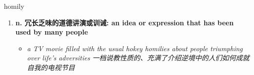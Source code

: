 
\begin{frame}
{\huge homily}
\begin{center}
\begin{enumerate}\Large
  \item \textbf{n. 冗长乏味的道德讲演或训诫: an idea or expression that has been used by many people}
  \begin{itemize}
    \item \em{\Large{a TV movie filled with the usual hokey homilies about people triumphing over life's adversities 一档说教性质的、充满了介绍逆境中的人们如何成就自我的电视节目}}
  \end{itemize}
\end{enumerate}
\end{center}
\end{frame}
